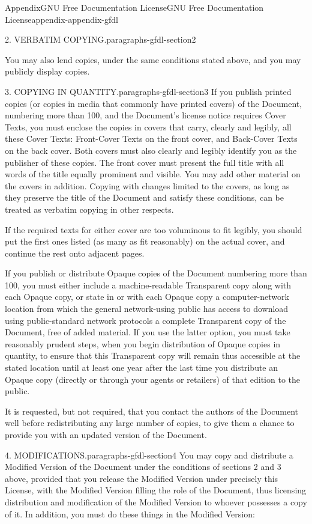\documentclass[twoside,10pt,]{book}
\numberwithin{equation}{part}
\begin{document}
\begin{appendixptx}{Appendix}{GNU Free Documentation License}{}{GNU Free Documentation License}{}{}{appendix-appendix-gfdl}
\begin{paragraphs}{2. VERBATIM COPYING.}{paragraphs-gfdl-section2}
\par
You may also lend copies, under the same conditions stated above, and you may publicly display copies.%
\end{paragraphs}%
\begin{paragraphs}{3. COPYING IN QUANTITY.}{paragraphs-gfdl-section3}%
If you publish printed copies (or copies in media that commonly have printed covers) of the Document, numbering more than 100, and the Document's license notice requires Cover Texts, you must enclose the copies in covers that carry, clearly and legibly, all these Cover Texts: Front-Cover Texts on the front cover, and Back-Cover Texts on the back cover. Both covers must also clearly and legibly identify you as the publisher of these copies. The front cover must present the full title with all words of the title equally prominent and visible. You may add other material on the covers in addition. Copying with changes limited to the covers, as long as they preserve the title of the Document and satisfy these conditions, can be treated as verbatim copying in other respects.%
\par
If the required texts for either cover are too voluminous to fit legibly, you should put the first ones listed (as many as fit reasonably) on the actual cover, and continue the rest onto adjacent pages.%
\par
If you publish or distribute Opaque copies of the Document numbering more than 100, you must either include a machine-readable Transparent copy along with each Opaque copy, or state in or with each Opaque copy a computer-network location from which the general network-using public has access to download using public-standard network protocols a complete Transparent copy of the Document, free of added material. If you use the latter option, you must take reasonably prudent steps, when you begin distribution of Opaque copies in quantity, to ensure that this Transparent copy will remain thus accessible at the stated location until at least one year after the last time you distribute an Opaque copy (directly or through your agents or retailers) of that edition to the public.%
\par
It is requested, but not required, that you contact the authors of the Document well before redistributing any large number of copies, to give them a chance to provide you with an updated version of the Document.%
\end{paragraphs}%
\begin{paragraphs}{4. MODIFICATIONS.}{paragraphs-gfdl-section4}%
You may copy and distribute a Modified Version of the Document under the conditions of sections 2 and 3 above, provided that you release the Modified Version under precisely this License, with the Modified Version filling the role of the Document, thus licensing distribution and modification of the Modified Version to whoever possesses a copy of it. In addition, you must do these things in the Modified Version:%

\end{paragraphs}
\end{appendixptx}
\end{document}
